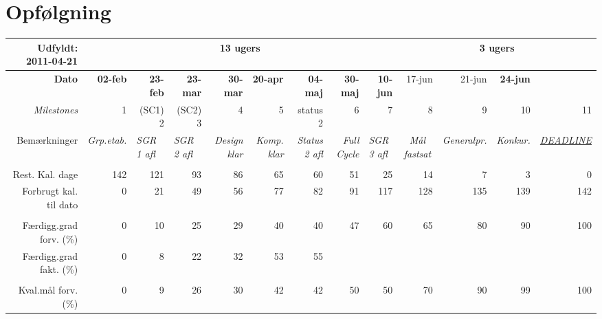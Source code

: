 \section{Opfølgning}

\begin{sidewaystable}[!htbp]
\begin{scriptsize}
    \begin{tabular}{r|rrrrrrrr|rrrr}
Udfyldt: 2011-04-21    & \multicolumn{8}{c|}{13 ugers} & \multicolumn{4}{c}{3 ugers} \\ \hline
    \textbf{Dato} & \textbf{02-feb} & \textbf{23-feb} & \textbf{23-mar} & \textbf{30-mar} & \textbf{20-apr} & \textbf{04-maj} & \textbf{30-maj} & \textbf{10-jun} & 17-jun & 21-jun & \textbf{24-jun} \\
    \textit{Milestones} & 1     & (SC1) 2 & (SC2) 3 & 4     & 5     & status 2 & 6     & 7     & 8     & 9     & 10    & 11 \\
    Bemærkninger & \textit{Grp.etab.} & \multicolumn{1}{l}{\textit{SGR 1 afl}} & \multicolumn{1}{l}{\textit{SGR 2 afl}} & \textit{Design klar} & \textit{Komp. klar} & \textit{Status 2 afl} & \textit{Full Cycle} & \multicolumn{1}{l|}{\textit{SGR 3 afl}} & \multicolumn{1}{c}{\textit{Mål fastsat}} & \multicolumn{1}{c}{\textit{Generalpr.}} & \multicolumn{1}{c}{\textit{Konkur.}} & \multicolumn{1}{c}{\textit{\underline{DEADLINE}}} \\
          &       &       &       &       &       &       &       & & & & &  \\
    Rest. Kal. dage & 142   & 121   & 93    & 86    & 65    & 60    & 51    & 25    & 14    & 7     & 3     & 0 \\
    Forbrugt kal. til dato & 0     & 21    & 49    & 56    & 77    & 82    & 91    & 117   & 128   & 135   & 139   & 142 \\
          &       &       &       &       &       &       &       &       &       &       &  \\
    Færdigg.grad forv. (\%) & 0     & 10    & 25    & 29    & 40    & 40    & 47    & 60    & 65    & 80    & 90   & 100  \\
    Færdigg.grad fakt. (\%) & 0     & 8     & 22    & 32    & 53    & 55    &       &       &       &       &   \\
          &       &       &       &       &       &       &       &       &       &       &  \\
    Kval.mål forv. (\%) & 0     & 9    & 26    & 30    & 42    & 42    & 50    & 50    & 70    & 90    & 99  & 100 \\

\end{tabular}
\end{scriptsize}
\end{sidewaystable}
